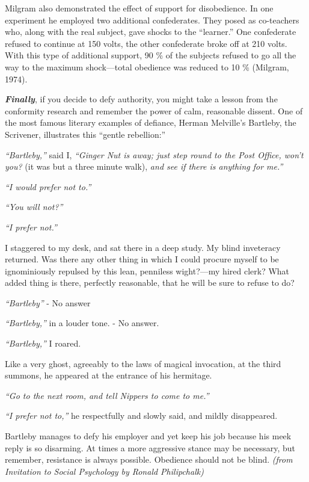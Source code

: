 \documentclass[
]{book}
\begin{document}
Milgram also demonstrated the effect of support for disobedience. In one experiment he employed two additional confederates. They posed as co-teachers who, along with the real subject, gave shocks to the ``learner.'' One confederate refused to continue at 150 volts, the other confederate broke off at 210 volts. With this type of additional support, 90 \% of the subjects refused to go all the way to the maximum shock---total obedience was reduced to 10 \% (Milgram, 1974).

\textbf{\emph{Finally}}, if you decide to defy authority, you might take a lesson from the conformity research and remember the power of calm, reasonable dissent. One of the most famous literary examples of defiance, Herman Melville's Bartleby, the Scrivener, illustrates this ``gentle rebellion:''

\emph{``Bartleby,''} said I, \emph{``Ginger Nut is away; just step round to the Post Office, won't you?} (it was but a three minute walk), \emph{and see if there is anything for me.''}

\emph{``I would prefer not to.''}

\emph{``You will not?''}

\emph{``I prefer not.''}

I staggered to my desk, and sat there in a deep study. My blind inveteracy returned. Was there any other thing in which I could procure myself to be ignominiously repulsed by this lean, penniless wight?---my hired clerk? What added thing is there, perfectly reasonable, that he will be sure to refuse to do?

\emph{``Bartleby''} - No answer

\emph{``Bartleby,''} in a louder tone. - No answer.

\emph{``Bartleby,''} I roared.

Like a very ghost, agreeably to the laws of magical invocation, at the third summons, he appeared at the entrance of his hermitage.

\emph{``Go to the next room, and tell Nippers to come to me.''}

\emph{``I prefer not to,''} he respectfully and slowly said, and mildly disappeared.

Bartleby manages to defy his employer and yet keep his job because his meek reply is so disarming. At times a more aggressive stance may be necessary, but remember, resistance is always possible. Obedience should not be blind. \emph{(from Invitation to Social Psychology by Ronald Philipchalk)}
\end{document}
